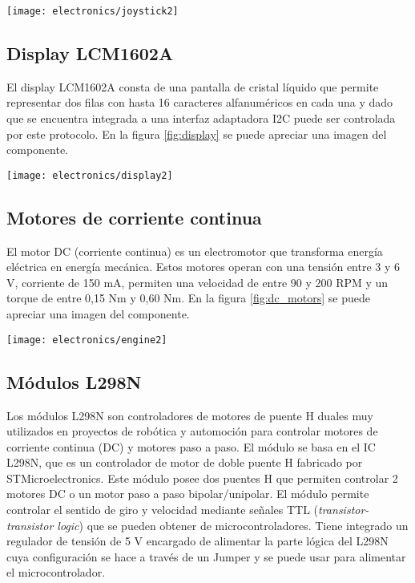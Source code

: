 \begin{center}
   \texttt{[image: electronics/joystick2]}
   \label{fig:joystick}
\end{center}


\subsection{Display LCM1602A}
El display LCM1602A \cite{LCM1602A_datasheet} consta de una pantalla de cristal líquido que permite representar dos filas con hasta 16 caracteres alfanuméricos en cada una y dado que se encuentra integrada a una interfaz adaptadora I2C puede ser controlada por este protocolo. En la figura \ref{fig:display} se puede apreciar una imagen del componente.

\begin{center}
   \texttt{[image: electronics/display2]}
   \label{fig:display}
\end{center}

\subsection{Motores de corriente continua}
El motor DC (corriente continua) \cite{dc_motor_datasheet} es un electromotor que transforma energía eléctrica en energía mecánica. Estos motores operan con una tensión entre 3 y 6 V, corriente de 150 mA, permiten una velocidad de entre 90 y 200 RPM y un torque de entre 0,15 Nm y 0,60 Nm. En la figura \ref{fig:dc_motors} se puede apreciar una imagen del componente.


\begin{center}
 \texttt{[image: electronics/engine2]}
   \label{fig:dc_motors}
\end{center}


\subsection{Módulos L298N}
Los módulos L298N \cite{L98N_Driver_Datasheet} son controladores de motores de puente H duales muy utilizados en proyectos de robótica y automoción para controlar motores de corriente continua (DC) y motores paso a paso. El módulo se basa en el IC L298N, que es un controlador de motor de doble puente H fabricado por STMicroelectronics. Este módulo posee dos puentes H que permiten controlar 2 motores DC o un motor paso a paso bipolar/unipolar. El módulo permite controlar el sentido de giro y velocidad mediante señales TTL (\textit{transistor-transistor logic}) que se pueden obtener de microcontroladores. Tiene integrado un regulador de tensión de 5 V encargado de alimentar la parte lógica del L298N cuya configuración se hace a través de un Jumper y se puede usar para alimentar el microcontrolador.


